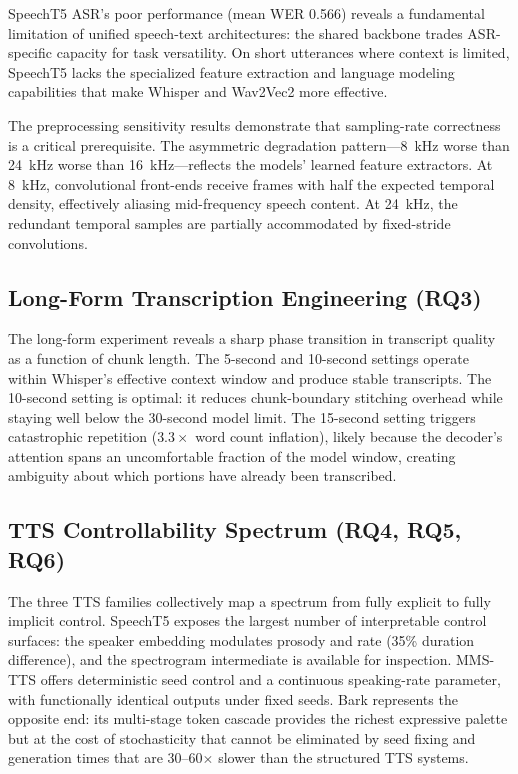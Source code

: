 \documentclass[conference]{IEEEtran}
\begin{document}
SpeechT5 ASR's poor performance (mean WER 0.566) reveals a fundamental limitation of unified speech-text architectures: the shared backbone trades ASR-specific capacity for task versatility. On short utterances where context is limited, SpeechT5 lacks the specialized feature extraction and language modeling capabilities that make Whisper and Wav2Vec2 more effective.

The preprocessing sensitivity results demonstrate that sampling-rate correctness is a critical prerequisite. The asymmetric degradation pattern---8~kHz worse than 24~kHz worse than 16~kHz---reflects the models' learned feature extractors. At 8~kHz, convolutional front-ends receive frames with half the expected temporal density, effectively aliasing mid-frequency speech content. At 24~kHz, the redundant temporal samples are partially accommodated by fixed-stride convolutions.

\subsection{Long-Form Transcription Engineering (RQ3)}

The long-form experiment reveals a sharp phase transition in transcript quality as a function of chunk length. The 5-second and 10-second settings operate within Whisper's effective context window and produce stable transcripts. The 10-second setting is optimal: it reduces chunk-boundary stitching overhead while staying well below the 30-second model limit. The 15-second setting triggers catastrophic repetition ($3.3\times$ word count inflation), likely because the decoder's attention spans an uncomfortable fraction of the model window, creating ambiguity about which portions have already been transcribed.

\subsection{TTS Controllability Spectrum (RQ4, RQ5, RQ6)}

The three TTS families collectively map a spectrum from fully explicit to fully implicit control. SpeechT5 exposes the largest number of interpretable control surfaces: the speaker embedding modulates prosody and rate (35\% duration difference), and the spectrogram intermediate is available for inspection. MMS-TTS offers deterministic seed control and a continuous speaking-rate parameter, with functionally identical outputs under fixed seeds. Bark represents the opposite end: its multi-stage token cascade provides the richest expressive palette but at the cost of stochasticity that cannot be eliminated by seed fixing and generation times that are 30--60$\times$ slower than the structured TTS systems.
\end{document}
